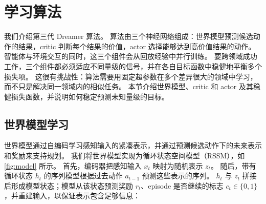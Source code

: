 

\section*{学习算法}
\label{sec:algorithm}

我们介绍第三代 Dreamer 算法\citep{hafner2019dreamer,hafner2020dreamerv2}。
算法由三个神经网络组成：世界模型预测候选动作的结果，critic 判断每个结果的价值，actor 选择能够达到高价值结果的动作。
智能体与环境交互的同时，这三个组件会从回放经验中并行训练。
要跨领域成功工作，三个组件都必须适应不同量级的信号，并在各自目标函数中稳健地平衡多个损失项。
这很有挑战性：算法需要用固定超参数在多个差异很大的领域中学习，而不只是解决同一领域内的相似任务。
本节介绍世界模型、critic 和 actor 及其稳健损失函数，并说明如何稳定预测未知量级的目标。

\subsection*{世界模型学习}

世界模型通过自编码学习感知输入的紧凑表示\citep{kingma2013vae}，并通过预测候选动作下的未来表示和奖励来支持规划。
我们将世界模型实现为循环状态空间模型（RSSM）\citep{hafner2018planet}，如 \cref{fig:model} 所示。
首先，编码器把感知输入 $x_t$ 映射为随机表示 $z_t$。
随后，带有循环状态 $h_t$ 的序列模型根据过去动作 $a_{t-1}$ 预测这些表示的序列。
$h_t$ 与 $z_t$ 拼接后形成模型状态；模型从该状态预测奖励 $r_t$、episode 是否继续的标志 $c_t\in\{0,1\}$，并重建输入，以保证表示包含足够信息：


